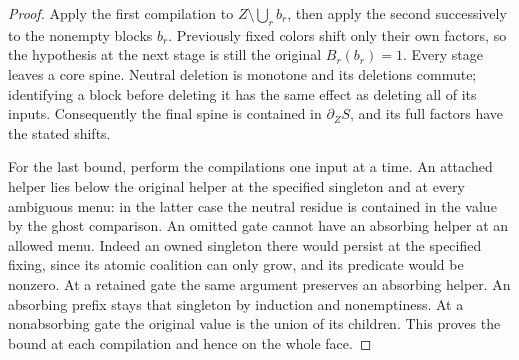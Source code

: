\begin{proof}
Apply the first compilation to $Z\setminus\bigcup_r b_r$, then apply
the second successively to the nonempty blocks $b_r$. Previously fixed
colors shift only their own factors, so the hypothesis at the next
stage is still the original $B_r(b_r)=1$. Every stage leaves a core
spine. Neutral deletion is monotone and its deletions commute; identifying
a block before deleting it has the same effect as deleting all of its
inputs. Consequently the final spine is contained in $\partial_ZS$,
and its full factors have the stated shifts.

For the last bound, perform the compilations one input at a time.
An attached helper lies below the original helper at the specified
singleton and at every ambiguous menu: in the latter case the neutral
residue is contained in the value by the ghost comparison. An omitted
gate cannot have an absorbing helper at an allowed menu. Indeed an
owned singleton there would persist at the specified fixing, since its
atomic coalition can only grow, and its predicate would be nonzero.
At a retained gate the same argument preserves an absorbing helper.
An absorbing prefix stays that singleton by induction and nonemptiness.
At a nonabsorbing gate the original value is the union of its children.
This proves the bound at each compilation and hence on the whole face.
\end{proof}

